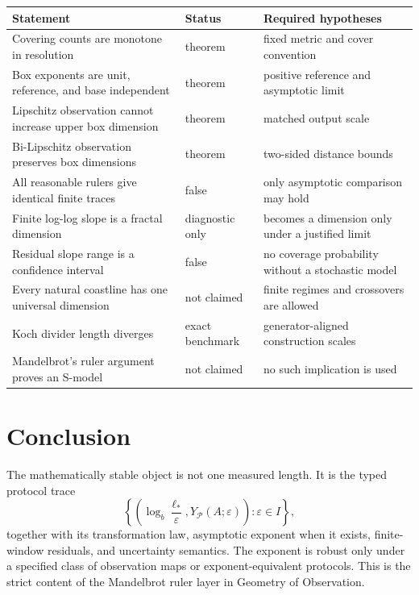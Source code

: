 \documentclass[11pt,a4paper]{article}
\theoremstyle{definition}
\theoremstyle{plain}
\theoremstyle{remark}
\newcommand{\Pcal}{\mathcal{P}}
\begin{document}
\begin{longtable}{L{0.42\textwidth}L{0.20\textwidth}L{0.28\textwidth}}
\toprule
Statement & Status & Required hypotheses\\
\midrule
\endhead
Covering counts are monotone in resolution & theorem & fixed metric and
cover convention\\
Box exponents are unit, reference, and base independent & theorem &
positive reference and asymptotic limit\\
Lipschitz observation cannot increase upper box dimension & theorem &
matched output scale\\
Bi-Lipschitz observation preserves box dimensions & theorem & two-sided
distance bounds\\
All reasonable rulers give identical finite traces & false & only
asymptotic comparison may hold\\
Finite log-log slope is a fractal dimension & diagnostic only & becomes a
dimension only under a justified limit\\
Residual slope range is a confidence interval & false & no coverage
probability without a stochastic model\\
Every natural coastline has one universal dimension & not claimed &
finite regimes and crossovers are allowed\\
Koch divider length diverges & exact benchmark & generator-aligned
construction scales\\
Mandelbrot's ruler argument proves an S-model & not claimed & no such
implication is used\\
\bottomrule
\end{longtable}

\section{Conclusion}

The mathematically stable object is not one measured length. It is the
typed protocol trace
\[
\left\{
\left(
\log_b\frac{\ell_*}{\varepsilon},
Y_\Pcal(A;\varepsilon)
\right)
:
\varepsilon\in I
\right\},
\]
together with its transformation law, asymptotic exponent when it exists,
finite-window residuals, and uncertainty semantics. The exponent is
robust only under a specified class of observation maps or
exponent-equivalent protocols. This is the strict content of the
Mandelbrot ruler layer in Geometry of Observation.
\end{document}
